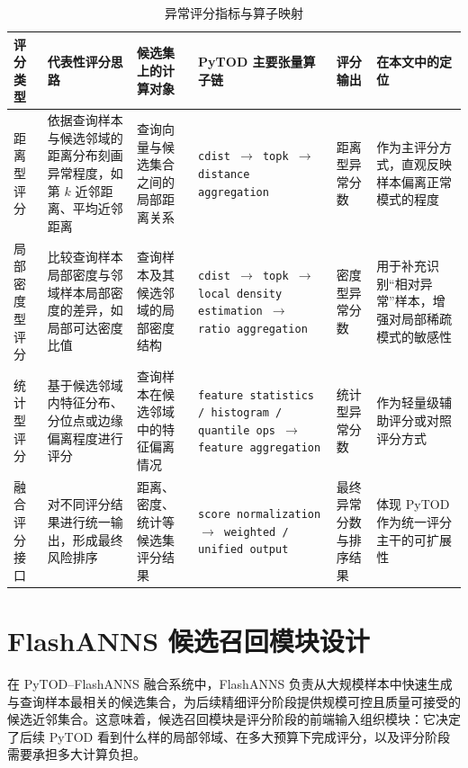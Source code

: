 \begin{table}[htbp]
  \caption{异常评分指标与算子映射}
  \label{tab:score-ops-map}
  \centering
  \small
  \renewcommand{\arraystretch}{1.2}
  \begin{adjustbox}{max width=\linewidth}
  \begin{tabular}{P{2.0cm} P{4.0cm} P{3.1cm} P{4.3cm} P{2.2cm} P{3.5cm}}
    \toprule
    评分类型 & 代表性评分思路 & 候选集上的计算对象 & PyTOD 主要张量算子链 & 评分输出 & 在本文中的定位\\
    \midrule
    距离型评分 & 依据查询样本与候选邻域的距离分布刻画异常程度，如第 $k$ 近邻距离、平均近邻距离 & 查询向量与候选集合之间的局部距离关系 & \texttt{cdist $\rightarrow$ topk $\rightarrow$ distance aggregation} & 距离型异常分数 & 作为主评分方式，直观反映样本偏离正常模式的程度\\
    局部密度型评分 & 比较查询样本局部密度与邻域样本局部密度的差异，如局部可达密度比值 & 查询样本及其候选邻域的局部密度结构 & \texttt{cdist $\rightarrow$ topk $\rightarrow$ local density estimation $\rightarrow$ ratio aggregation} & 密度型异常分数 & 用于补充识别“相对异常”样本，增强对局部稀疏模式的敏感性\\
    统计型评分 & 基于候选邻域内特征分布、分位点或边缘偏离程度进行评分 & 查询样本在候选邻域中的特征偏离情况 & \texttt{feature statistics / histogram / quantile ops $\rightarrow$ feature aggregation} & 统计型异常分数 & 作为轻量级辅助评分或对照评分方式\\
    融合评分接口 & 对不同评分结果进行统一输出，形成最终风险排序 & 距离、密度、统计等候选集评分结果 & \texttt{score normalization $\rightarrow$ weighted / unified output} & 最终异常分数与排序结果 & 体现 PyTOD 作为统一评分主干的可扩展性\\
    \bottomrule
  \end{tabular}
  \end{adjustbox}
\end{table}

\FloatBarrier

\section{FlashANNS 候选召回模块设计}

在 PyTOD--FlashANNS 融合系统中，FlashANNS 负责从大规模样本中快速生成与查询样本最相关的候选集合，为后续精细评分阶段提供规模可控且质量可接受的候选近邻集合\citep{xiao2025flashanns}。这意味着，候选召回模块是评分阶段的前端输入组织模块：它决定了后续 PyTOD 看到什么样的局部邻域、在多大预算下完成评分，以及评分阶段需要承担多大计算负担。

